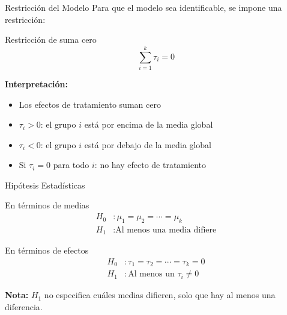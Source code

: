 \documentclass[10pt,aspectratio=169]{beamer}
\begin{document}
\begin{frame}{Restricción del Modelo}
Para que el modelo sea identificable, se impone una restricción:

\vspace{0.3cm}

\begin{block}{Restricción de suma cero}
\begin{equation*}
\sum_{i=1}^{k} \tau_i = 0
\end{equation*}
\end{block}

\vspace{0.3cm}

\textbf{Interpretación:}
\begin{itemize}
    \item Los efectos de tratamiento suman cero
    \item $\tau_i > 0$: el grupo $i$ está por encima de la media global
    \item $\tau_i < 0$: el grupo $i$ está por debajo de la media global
    \item Si $\tau_i = 0$ para todo $i$: no hay efecto de tratamiento
\end{itemize}
\end{frame}

\begin{frame}{Hipótesis Estadísticas}
\begin{block}{En términos de medias}
\begin{align*}
H_0 &: \mu_1 = \mu_2 = \cdots = \mu_k \\
H_1 &: \text{Al menos una media difiere}
\end{align*}
\end{block}

\vspace{0.3cm}

\begin{block}{En términos de efectos}
\begin{align*}
H_0 &: \tau_1 = \tau_2 = \cdots = \tau_k = 0 \\
H_1 &: \text{Al menos un } \tau_i \neq 0
\end{align*}
\end{block}

\vspace{0.3cm}

\textbf{Nota:} $H_1$ no especifica \alert{cuáles} medias difieren, solo que hay \alert{al menos una} diferencia.
\end{frame}
\end{document}
